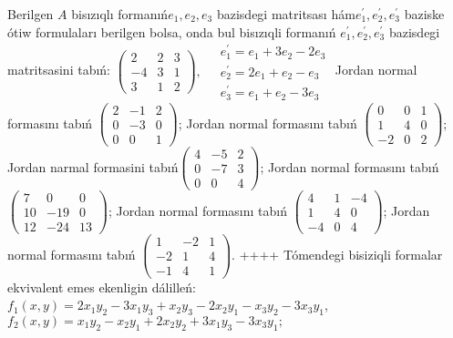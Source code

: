 Berilgen \(A\) bisızıqlı formanıń\(e_{1},e_{2},e_{3}\) bazisdegi matritsası hám\(e_{1}^{'},e_{2}^{'},e_{3}^{'}\) baziske ótiw formulaları berilgen bolsa, onda bul bisızıqli formanıń \(e_{1}^{'},e_{2}^{'},e_{3}^{'}\) bazisdegi matritsasini tabıń: \(\begin{pmatrix} 2 & 2 & 3 \\  - 4 & 3 & 1 \\ 3 & 1 & 2 \end{pmatrix},\ \begin{matrix}  & e_{1}^{'} = e_{1} + 3e_{2} - 2e_{3} \\  & e_{2}^{'} = 2e_{1} + e_{2} - e_{3} \\  & e_{3}^{'} = e_{1} + e_{2} - 3e_{3} \end{matrix}\)
Jordan normal formasını tabıń \(\begin{pmatrix} 2 & - 1 & 2 \\ 0 & - 3 & 0 \\ 0 & 0 & 1 \end{pmatrix}\);
Jordan normal formasını tabıń \(\begin{pmatrix} 0 & 0 & 1 \\ 1 & 4 & 0 \\  - 2 & 0 & 2 \end{pmatrix}\);
Jordan narmal formasini tabıń\(\begin{pmatrix} 4 & - 5 & 2 \\ 0 & - 7 & 3 \\ 0 & 0 & 4 \end{pmatrix}\);
Jordan normal formasını tabıń \(\begin{pmatrix} 7 & 0 & 0 \\ 10 & - 19 & 0 \\ 12 & - 24 & 13 \end{pmatrix}\);
Jordan normal formasını tabıń \(\begin{pmatrix} 4 & 1 & - 4 \\ 1 & 4 & 0 \\  - 4 & 0 & 4 \end{pmatrix}\);
Jordan normal formasını tabıń \(\begin{pmatrix} 1 & - 2 & 1 \\  - 2 & 1 & 4 \\  - 1 & 4 & 1 \end{pmatrix}\).
++++
Tómendegi bisiziqli formalar ekvivalent emes ekenligin dálilleń:\(f_{1}(x,y) = 2x_{1}y_{2} - 3x_{1}y_{3} + x_{2}y_{3} - 2x_{2}y_{1} - x_{3}y_{2} - 3x_{3}y_{1}\),\(f_{2}(x,y) = x_{1}y_{2} - x_{2}y_{1} + 2x_{2}y_{2} + 3x_{1}y_{3} - 3x_{3}y_{1};\)
